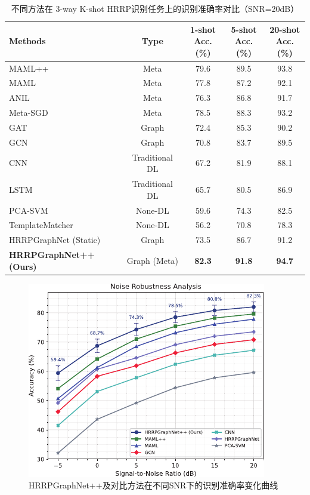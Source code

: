 \begin{table}[h!]
\centering
\caption{不同方法在 3-way K-shot HRRP识别任务上的识别准确率对比（SNR=20dB）}
\label{tab:fewshot_comparison_chap3}
\begin{tabular}{l|c|ccc}
\toprule
\textbf{Methods}  &\textbf{Type}                & \makecell{\textbf{1-shot}\\\textbf{Acc. (\%)}} & \makecell{\textbf{5-shot}\\\textbf{Acc. (\%)}} & \makecell{\textbf{20-shot}\\\textbf{Acc. (\%)}} \\
\midrule
MAML++ \cite{antoniou_how_2018}&Meta & 79.6   & 89.5   & 93.8    \\
MAML \cite{finn_model-agnostic_2017}&Meta       & 77.8   & 87.2   & 92.1    \\
ANIL \cite{aniruddh_anil_2020} &Meta& 76.3   & 86.8   & 91.7    \\
Meta-SGD \cite{li_meta-sgd_2017} & Meta& 78.5   & 88.3   & 93.2    \\
GAT \cite{velickovic_graph_2018}  & Graph&72.4   & 85.3   & 90.2    \\
GCN \cite{kipf_semi-supervised_2017}  & Graph&70.8   & 83.7   & 89.5    \\
CNN \cite{song_radar_2019}        & Traditional DL&67.2   & 81.9   & 88.1    \\
LSTM \cite{jithesh_lstm_2017}       & Traditional DL&65.7   & 80.5   & 86.9    \\
PCA-SVM \cite{liu_experimental_2020}     &None-DL& 59.6   & 74.3   & 82.5    \\
TemplateMatcher \cite{cui_template_2022} &None-DL& 56.2   & 70.8   & 78.3    \\
\midrule
HRRPGraphNet \cite{chen_hrrpgraphnet_2024} (Static) & Graph & 73.5   & 86.7   & 91.2    \\
\textbf{HRRPGraphNet++} \textbf{(Ours)} & Graph (Meta)& \textbf{82.3}   & \textbf{91.8}   & \textbf{94.7}    \\
\bottomrule
\end{tabular}
\end{table}

\begin{figure}[t]
    \centering
    \includegraphics[width=0.6\linewidth]{figures/noise_robust.pdf} %
    \caption{HRRPGraphNet++及对比方法在不同SNR下的识别准确率变化曲线}
    \label{fig:noise_robustness_chap3}
\end{figure}

